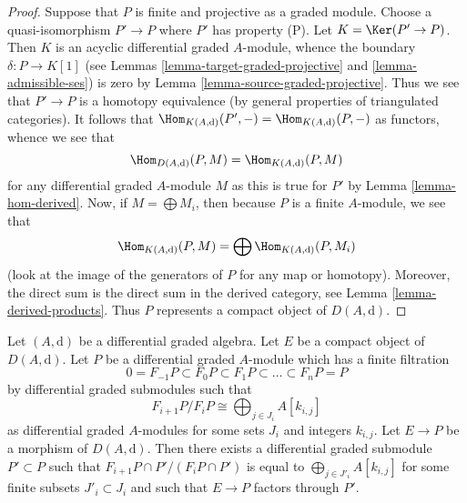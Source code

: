 \begin{proof}
Suppose that $P$ is finite and projective as a graded module.
Choose a quasi-isomorphism $P' \to P$ where $P'$ has property (P).
Let $K = \Ker(P' \to P)$. Then $K$ is an acyclic differential
graded $A$-module, whence the boundary $\delta : P \to K[1]$
(see Lemmas \ref{lemma-target-graded-projective} and
\ref{lemma-admissible-ses})
is zero by Lemma \ref{lemma-source-graded-projective}.
Thus we see that $P' \to P$ is a homotopy equivalence (by general
properties of triangulated categories). It follows that
$\Hom_{K(A, \text{d})}(P', -) = \Hom_{K(A, \text{d})}(P, -)$
as functors, whence we see that
$$
\Hom_{D(A, \text{d})}(P, M) = 
\Hom_{K(A, \text{d})}(P, M)
$$
for any differential graded $A$-module $M$ as this is true for $P'$
by Lemma \ref{lemma-hom-derived}.
Now, if $M = \bigoplus M_i$,
then because $P$ is a finite $A$-module, we see that
$$
\Hom_{K(A, \text{d})}(P, M) = \bigoplus \Hom_{K(A, \text{d})}(P, M_i)
$$
(look at the image of the generators of $P$ for any map or homotopy).
Moreover, the direct sum is the direct sum in the derived category, see
Lemma \ref{lemma-derived-products}.
Thus $P$ represents a compact object of $D(A, \text{d})$.
\end{proof}

\begin{lemma}
\label{lemma-factor-through-nicer}
Let $(A, \text{d})$ be a differential graded algebra. Let $E$ be a compact
object of $D(A, \text{d})$. Let $P$ be a differential graded $A$-module
which has a finite filtration
$$
0 = F_{-1}P \subset F_0P \subset F_1P \subset \ldots \subset F_nP = P
$$
by differential graded submodules such that
$$
F_{i + 1}P/F_iP \cong \bigoplus\nolimits_{j \in J_i} A[k_{i, j}]
$$
as differential graded $A$-modules for some sets $J_i$ and integers $k_{i, j}$.
Let $E \to P$ be a morphism of $D(A, \text{d})$.
Then there exists a differential graded submodule $P' \subset P$ such that
$F_{i + 1}P \cap P'/(F_iP \cap P')$ is equal to
$\bigoplus_{j \in J'_i} A[k_{i, j}]$ for some finite subsets
$J'_i \subset J_i$ and such that $E \to P$ factors through $P'$.
\end{lemma}


